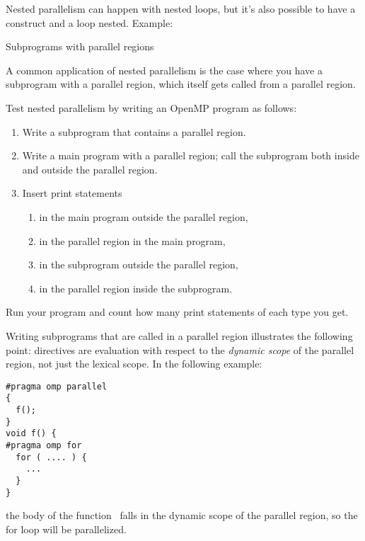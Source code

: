 Nested parallelism can happen with nested loops,
but it's also possible to have a  construct
and a loop nested.
Example:
\begin{multicols}{2}
  \tiny
  
\end{multicols}

 {Subprograms with parallel regions}

A common application of nested parallelism is the case
where you have a subprogram with a parallel region,
which itself gets called from a parallel region.

\begin{exercise}
  Test nested parallelism by writing an OpenMP program as follows:
  \begin{enumerate}
  \item Write a subprogram that contains a parallel region.
  \item\label{ex:nest:sub} Write a main program with a parallel region; call the subprogram both inside and outside the parallel region.
    \item Insert print statements 
      \begin{enumerate}
      \item in the main program outside the parallel region,
      \item in the parallel region in the main program,
      \item\label{ex:nest:sub:sub} in the subprogram outside the parallel region,
      \item in the parallel region inside the subprogram.
      \end{enumerate}
  \end{enumerate}
  Run your program and count how many print statements of each type you get.
\end{exercise}

Writing subprograms that are called in a parallel region illustrates
the following point: directives are evaluation with respect to the
\emph{dynamic scope} of the
parallel region, not just the lexical scope. In the following example:
\begin{lstlisting}
#pragma omp parallel
{
  f();
}
void f() {
#pragma omp for
  for ( .... ) {
    ...
  }
}
\end{lstlisting}
the body of the function~ falls in the dynamic scope of the
parallel region, so the for loop will be parallelized.

